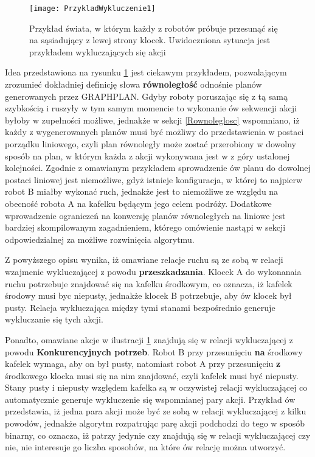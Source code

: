     \begin{figure}[H]
        \texttt{[image: PrzykladWykluczenie1]}
        \centering
        \caption{Przykład świata, w którym każdy z robotów próbuje przesunąć się na sąsiadujący z lewej strony klocek. Uwidoczniona sytuacja 
        jest przykładem wykluczających się akcji}
        \label{PrzykladWykluczenie1}
    \end{figure}

    Idea przedstawiona na rysunku \ref{PrzykladWykluczenie1} jest ciekawym przykładem, pozwalającym zrozumieć dokładniej definicję słowa 
    \textbf{równoległość} odnośnie planów generowanych przez GRAPHPLAN. Gdyby roboty poruszając się z tą samą szybkością i ruszyły w tym samym momencie
    to wykonanie ów sekwencji akcji byłoby w zupełności możliwe, jednakże w sekcji \ref{Rownoleglosc} wspomniano, iż każdy z wygenerowanych planów 
    musi być możliwy do przedstawienia w postaci porządku liniowego, czyli plan równoległy może zostać przerobiony w dowolny sposób na plan,
    w którym każda z akcji wykonywana jest w z góry ustalonej kolejności.
    Zgodnie z omawianym przykładem sprowadzenie ów planu do dowolnej postaci liniowej jest 
    niemożliwe, gdyż istnieje konfiguracja, w której to najpierw robot B miałby wykonać ruch, jednakże jest to niemożliwe ze względu na 
    obecność robota A na kafelku będącym jego celem podróży. Dodatkowe wprowadzenie ograniczeń na konwersję planów równoległych na liniowe 
    jest bardziej skompilowanym zagadnieniem, którego omówienie nastąpi w sekcji odpowiedzialnej za możliwe rozwinięcia algorytmu.
    
    Z powyższego opisu wynika, iż 
    omawiane relacje ruchu są ze sobą w relacji wzajmenie wykluczającej z powodu \textbf{przeszkadzania}. 
    Klocek A do wykonanaia ruchu potrzebuje znajdować się na kafelku środkowym, co oznacza, iż kafelek środowy musi byc niepusty, 
    jednakże klocek B potrzebuje, aby ów klocek był pusty. Relacja wykluczająca między tymi stanami bezpośrednio generuje wykluczanie się tych akcji.
    
    Ponadto, omawiane akcje w ilustracji \ref{PrzykladWykluczenie1} znajdują się w relacji wykluczającej z powodu \textbf{Konkurencyjnych potrzeb}. 
    Robot B przy przesunięciu \textbf{na} środkowy kafelek wymaga, aby on był pusty, natomiast robot A przy przesunięciu \textbf{z} środkowego klocka 
    musi się na nim znajdować, czyli kafelek musi być niepusty. Stany pusty i niepusty względem kafelka są w oczywistej relacji wykluczającej 
    co automatycznie generuje wykluczenie się wspomnianej pary akcji. Przykład ów przedstawia, iż jedna para akcji może być ze sobą w relacji wykluczającej 
    z kilku powodów, jednakże algorytm rozpatrując parę akcji podchodzi do tego w sposób binarny, co oznacza, iż patrzy jedynie czy znajdują się w 
    relacji wykluczającej czy nie, nie interesuje go liczba sposobów, na które ów relację można utworzyć.    

